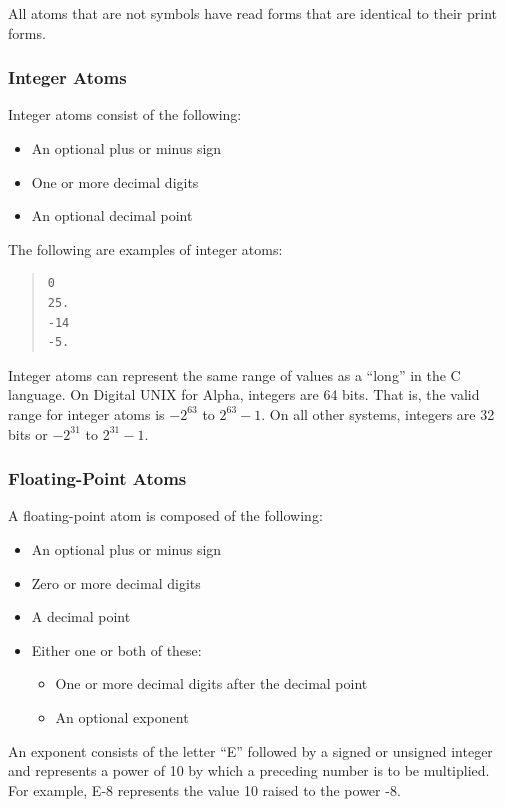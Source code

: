 All atoms that are not symbols have read forms that are identical to
their print forms.

\subsubsection{Integer Atoms}

Integer atoms consist of the following:

\begin{itemize}
\item An optional plus or minus sign
\item One or more decimal digits
\item An optional decimal point
\end{itemize}

The following are examples of integer atoms:

\begin{quote}
\begin{verbatim}
0
25.
-14
-5.
\end{verbatim}
\end{quote}

Integer atoms can represent the same range of values as a ``long'' in
the C language. On Digital UNIX for Alpha, integers are 64 bits. That
is, the valid range for integer atoms is $-2^{63}$ to $2^{63}- 1$. On
all other systems, integers are 32 bits or $-2^{31}$ to $2^{31}-1$.

\subsubsection{Floating-Point Atoms}

A floating-point atom is composed of the following:

\begin{itemize}
\item An optional plus or minus sign
\item Zero or more decimal digits
\item A decimal point
\item Either one or both of these:
  \begin{itemize}
  \item One or more decimal digits after the decimal point
  \item An optional exponent
  \end{itemize}
\end{itemize}

An exponent consists of the letter ``E'' followed by a signed
or unsigned integer and represents a power of 10 by which a
preceding number is to be multiplied. For example, E-8
represents the value 10 raised to the power -8.

